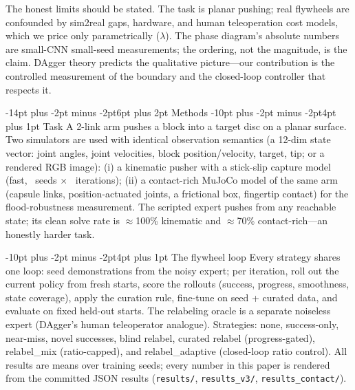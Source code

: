 \documentclass[10pt]{article}
\makeatletter
\renewcommand\section{\@startsection{section}{1}{\z@}%
  {-14pt plus -2pt minus -2pt}{6pt plus 2pt}%
  {\normalfont\bfseries\large}}
\renewcommand\subsection{\@startsection{subsection}{2}{\z@}%
  {-10pt plus -2pt minus -2pt}{4pt plus 1pt}%
  {\normalfont\bfseries\normalsize}}
\makeatother
\begin{document}
The honest limits should be stated. The task is planar pushing; real flywheels
are confounded by sim2real gaps, hardware, and human teleoperation cost
models, which we price only parametrically ($\lambda$). The phase diagram's
absolute numbers are small-CNN small-seed measurements; the ordering, not the
magnitude, is the claim. DAgger theory predicts the qualitative picture---our
contribution is the controlled measurement of the boundary and the closed-loop
controller that respects it.

\section{Methods}
\subsection{Task}
A 2-link arm pushes a block into a target disc on a planar surface. Two
simulators are used with identical observation semantics (a 12-dim state
vector: joint angles, joint velocities, block position/velocity, target, tip;
or a rendered RGB image): (i) a kinematic pusher with a stick-slip capture
model (fast, \numSeeds\ seeds $\times$ \numIter\ iterations); (ii) a
contact-rich MuJoCo model of the same arm (capsule links, position-actuated
joints, a frictional box, fingertip contact) for the flood-robustness
measurement. The scripted expert pushes from any reachable state; its clean
solve rate is $\approx$100\% kinematic and $\approx$70\% contact-rich---an
honestly harder task.

\subsection{The flywheel loop}
Every strategy shares one loop: seed demonstrations from the noisy expert;
per iteration, roll out the current policy from fresh starts, score the
rollouts (success, progress, smoothness, state coverage), apply the curation
rule, fine-tune on seed + curated data, and evaluate on fixed held-out starts.
The relabeling oracle is a separate noiseless expert (DAgger's human
teleoperator analogue). Strategies: none, success-only, near-miss, novel
successes, blind relabel, curated relabel (progress-gated), relabel\_mix
(ratio-capped), and relabel\_adaptive (closed-loop ratio control). All results
are means over training seeds; every number in this paper is rendered from the
committed JSON results (\texttt{results/}, \texttt{results\_v3/},
\texttt{results\_contact/}).
\end{document}
